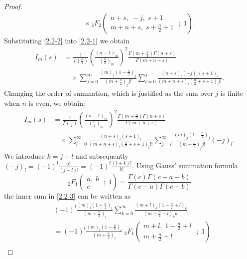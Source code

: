 \documentclass{article}
\theoremstyle{boldremark}
\renewcommand\[{\begin{equation}}
\renewcommand\]{\end{equation}}
\theoremstyle{definition}
\numberwithin{equation}{section}
\begin{document}
\begin{proof}
\begin{align}
    &\quad\quad \times {}_3F_2 \left( \begin{matrix} n+s,\; -j,\; s+1 \\[4pt] m+n+s,\; s+\frac{n}{2}+1 \end{matrix} \;;\; 1 \right).
\end{align}
Substituting \eqref{2.2-2} into \eqref{2.2-1} we obtain
\begin{align}
    I_m(s) &= \frac{1}{\Gamma\left(\frac{n}{2}\right)} \left( \frac{(n-1)_m}{\left(\frac{n}{2}\right)_m} \right)^2 \frac{\Gamma\left(m + \frac{n}{2}\right) \Gamma(n + s)}{\Gamma(m + n + s)} \nonumber \\
    &\quad \times \sum_{j=0}^{\infty} \frac{(m)_j \left(1 - \frac{n}{2}\right)_j}{\left(m + \frac{n}{2}\right)_j j!} \sum_{l=0}^{j} \frac{(n+s)_l (-j)_l (s+1)_l}{(m+n+s)_l \left(\frac{n}{2} + s + 1\right)_l l!}.
\end{align}
Changing the order of summation, which is justified as the sum over $j$ is finite when $n$ is even, we obtain:
\begin{align} \label{2.2-3}
    I_m(s) &= \frac{1}{\Gamma\left(\frac{n}{2}\right)} \left( \frac{(n-1)_m}{\left(\frac{n}{2}\right)_m} \right)^2 \frac{\Gamma\left(m + \frac{n}{2}\right) \Gamma(n + s)}{\Gamma(m + n + s)} \nonumber \\
    &\quad \times \sum_{l=0}^{\infty} \frac{(n+s)_l (s+1)_l}{(m+n+s)_l \left(\frac{n}{2} + s + 1\right)_l l!} \sum_{j=l}^{\infty} \frac{(m)_j \left(1 - \frac{n}{2}\right)_j}{\left(m + \frac{n}{2}\right)_j j!} (-j)_l.
\end{align}
We introduce $k = j - l$ and subsequently $(-j)_l = (-1)^l \frac{j!}{(j-l)!} = (-1)^l \frac{(l+k)!}{k!}$. 
Using Gauss' summation formula
\begin{equation*}
    {}_2F_1 \left( \begin{matrix} a,\; b \\ c \end{matrix} \;;\; 1 \right) = \frac{\Gamma(c)\Gamma(c - a - b)}{\Gamma(c - a)\Gamma(c - b)}
\end{equation*}
the inner sum in \eqref{2.2-3} can be written as 
\begin{align}\label{pro 2.2 - 4}
    &(-1)^l \frac{(m)_l \left(1 - \frac{n}{2}\right)_l}{\left(m + \frac{n}{2}\right)_l} \sum_{k=0}^{\infty} \frac{(m+l)_k \left(1 - \frac{n}{2} + l\right)_k}{\left(m + \frac{n}{2} + l\right)_k k!} \nonumber \\
    &= (-1)^l \frac{(m)_l \left(1 - \frac{n}{2}\right)_l}{\left(m + \frac{n}{2}\right)_l} \; {}_2F_1 \left( \begin{matrix} m+l,\; 1 - \frac{n}{2} + l \\[4pt] m + \frac{n}{2} + l \end{matrix} \;;\; 1 \right) \nonumber \\

\end{align}
\end{proof}
\end{document}
